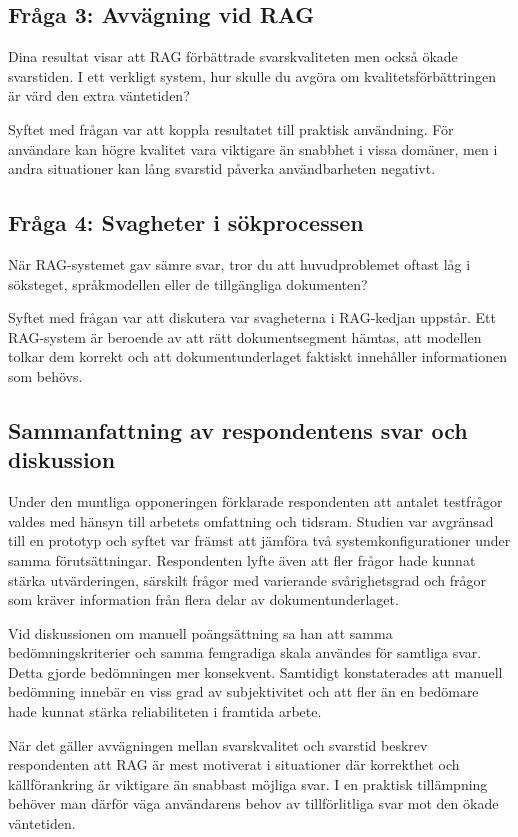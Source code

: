 \documentclass[12pt,a4paper]{article}
\begin{document}
\subsection{Fråga 3: Avvägning vid RAG}

Dina resultat visar att RAG förbättrade svarskvaliteten men också ökade svarstiden. I ett verkligt system, hur skulle du avgöra om kvalitetsförbättringen är värd den extra väntetiden?

Syftet med frågan var att koppla resultatet till praktisk användning. För användare kan högre kvalitet vara viktigare än snabbhet i vissa domäner, men i andra situationer kan lång svarstid påverka användbarheten negativt.

\subsection{Fråga 4: Svagheter i sökprocessen}

När RAG-systemet gav sämre svar, tror du att huvudproblemet oftast låg i söksteget, språkmodellen eller de tillgängliga dokumenten?

Syftet med frågan var att diskutera var svagheterna i RAG-kedjan uppstår. Ett RAG-system är beroende av att rätt dokumentsegment hämtas, att modellen tolkar dem korrekt och att dokumentunderlaget faktiskt innehåller informationen som behövs.


\subsection{Sammanfattning av respondentens svar och diskussion}

Under den muntliga opponeringen förklarade respondenten att antalet testfrågor valdes med hänsyn till arbetets omfattning och tidsram. Studien var avgränsad till en prototyp och syftet var främst att jämföra två systemkonfigurationer under samma förutsättningar. Respondenten lyfte även att fler frågor hade kunnat stärka utvärderingen, särskilt frågor med varierande svårighetsgrad och frågor som kräver information från flera delar av dokumentunderlaget.

Vid diskussionen om manuell poängsättning sa han att samma bedömningskriterier och samma femgradiga skala användes för samtliga svar. Detta gjorde bedömningen mer konsekvent. Samtidigt konstaterades att manuell bedömning innebär en viss grad av subjektivitet och att fler än en bedömare hade kunnat stärka reliabiliteten i framtida arbete.

När det gäller avvägningen mellan svarskvalitet och svarstid beskrev respondenten att RAG är mest motiverat i situationer där korrekthet och källförankring är viktigare än snabbast möjliga svar. I en praktisk tillämpning behöver man därför väga användarens behov av tillförlitliga svar mot den ökade väntetiden.
\end{document}
